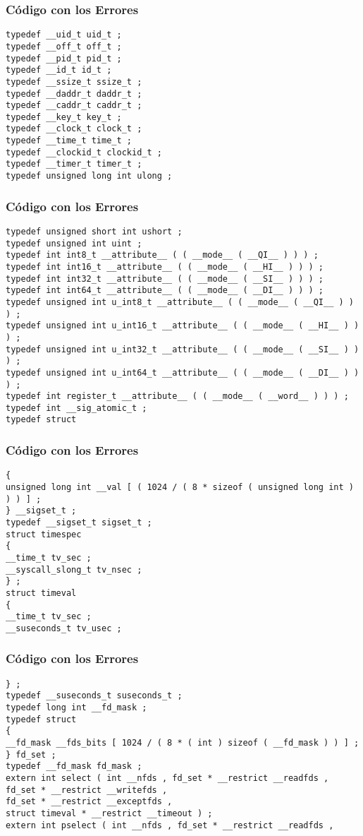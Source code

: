 \documentclass{beamer}
\begin{document}
\begin{frame}[fragile]
\frametitle{C\'odigo con los Errores}
\begin{lstlisting}[style=CStyle]
typedef __uid_t uid_t ; 
typedef __off_t off_t ; 
typedef __pid_t pid_t ; 
typedef __id_t id_t ; 
typedef __ssize_t ssize_t ; 
typedef __daddr_t daddr_t ; 
typedef __caddr_t caddr_t ; 
typedef __key_t key_t ; 
typedef __clock_t clock_t ; 
typedef __time_t time_t ; 
typedef __clockid_t clockid_t ; 
typedef __timer_t timer_t ; 
typedef unsigned long int ulong ; 
\end{lstlisting}
\end{frame}
\begin{frame}[fragile]
\frametitle{C\'odigo con los Errores}
\begin{lstlisting}[style=CStyle]
typedef unsigned short int ushort ; 
typedef unsigned int uint ; 
typedef int int8_t __attribute__ ( ( __mode__ ( __QI__ ) ) ) ; 
typedef int int16_t __attribute__ ( ( __mode__ ( __HI__ ) ) ) ; 
typedef int int32_t __attribute__ ( ( __mode__ ( __SI__ ) ) ) ; 
typedef int int64_t __attribute__ ( ( __mode__ ( __DI__ ) ) ) ; 
typedef unsigned int u_int8_t __attribute__ ( ( __mode__ ( __QI__ ) ) ) ; 
typedef unsigned int u_int16_t __attribute__ ( ( __mode__ ( __HI__ ) ) ) ; 
typedef unsigned int u_int32_t __attribute__ ( ( __mode__ ( __SI__ ) ) ) ; 
typedef unsigned int u_int64_t __attribute__ ( ( __mode__ ( __DI__ ) ) ) ; 
typedef int register_t __attribute__ ( ( __mode__ ( __word__ ) ) ) ; 
typedef int __sig_atomic_t ; 
typedef struct 
\end{lstlisting}
\end{frame}
\begin{frame}[fragile]
\frametitle{C\'odigo con los Errores}
\begin{lstlisting}[style=CStyle]
{ 
unsigned long int __val [ ( 1024 / ( 8 * sizeof ( unsigned long int ) ) ) ] ; 
} __sigset_t ; 
typedef __sigset_t sigset_t ; 
struct timespec 
{ 
__time_t tv_sec ; 
__syscall_slong_t tv_nsec ; 
} ; 
struct timeval 
{ 
__time_t tv_sec ; 
__suseconds_t tv_usec ; 
\end{lstlisting}
\end{frame}
\begin{frame}[fragile]
\frametitle{C\'odigo con los Errores}
\begin{lstlisting}[style=CStyle]
} ; 
typedef __suseconds_t suseconds_t ; 
typedef long int __fd_mask ; 
typedef struct 
{ 
__fd_mask __fds_bits [ 1024 / ( 8 * ( int ) sizeof ( __fd_mask ) ) ] ; 
} fd_set ; 
typedef __fd_mask fd_mask ; 
extern int select ( int __nfds , fd_set * __restrict __readfds , 
fd_set * __restrict __writefds , 
fd_set * __restrict __exceptfds , 
struct timeval * __restrict __timeout ) ; 
extern int pselect ( int __nfds , fd_set * __restrict __readfds , 
\end{lstlisting}
\end{frame}
\end{document}

